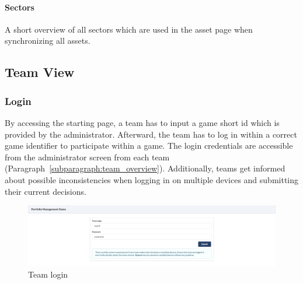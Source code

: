 \paragraph{Sectors}
A short overview of all sectors which are used in the asset page when synchronizing all assets.





\subsection{Team View}

\subsubsection{Login}
By accessing the starting page, a team has to input a game short id which is provided by the administrator. Afterward, the team has to log in within a correct game identifier to participate within a game. The login credentials are accessible from the administrator screen from each team (Paragraph~\ref{subparagraph:team_overview}). Additionally, teams get informed about possible inconsistencies when logging in on multiple devices and submitting their current decisions.
\begin{figure}[h!]
  \centering
  \includegraphics[scale=0.2]{img/application-overview/teams/01_login.png}
  \caption{Team login}
\end{figure}

